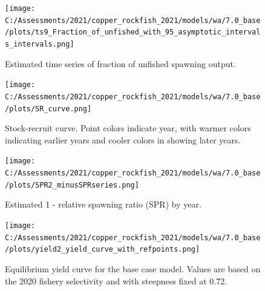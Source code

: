 \documentclass[11pt,
  english,
  a4paper,
]{article}
\begin{document}
\begin{figure}
\centering
\texttt{[image: C:/Assessments/2021/copper\_rockfish\_2021/models/wa/7.0\_base/plots/ts9\_Fraction\_of\_unfished\_with\_95\_asymptotic\_intervals\_intervals.png]}
\caption{Estimated time series of fraction of unfished spawning output.\label{fig:depl}}
\end{figure}

\tagmcend\tagstructend


\begin{figure}
\centering
\texttt{[image: C:/Assessments/2021/copper\_rockfish\_2021/models/wa/7.0\_base/plots/SR\_curve.png]}
\caption{Stock-recruit curve. Point colors indicate year, with warmer colors indicating earlier years and cooler colors in showing later years.\label{fig:bh-curve}}
\end{figure}

\tagmcend\tagstructend


\begin{figure}
\centering
\texttt{[image: C:/Assessments/2021/copper\_rockfish\_2021/models/wa/7.0\_base/plots/SPR2\_minusSPRseries.png]}
\caption{Estimated 1 - relative spawning ratio (SPR) by year.\label{fig:1-spr}}
\end{figure}

\tagmcend\tagstructend


\begin{figure}
\centering
\texttt{[image: C:/Assessments/2021/copper\_rockfish\_2021/models/wa/7.0\_base/plots/yield2\_yield\_curve\_with\_refpoints.png]}
\caption{Equilibrium yield curve for the base case model. Values are based on the 2020 fishery selectivity and with steepness fixed at 0.72.\label{fig:yield}}
\end{figure}

\tagmcend\tagstructend

\clearpage

\end{document}
